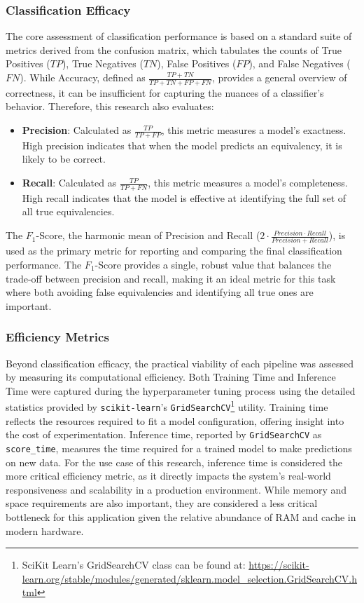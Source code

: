 \subsubsection{Classification Efficacy}\label{ch:3.4.2.1}
The core assessment of classification performance is based on a standard suite of metrics derived from the confusion matrix, which tabulates the counts of True Positives (\(TP\)), True Negatives (\(TN\)), False Positives (\(FP\)), and False Negatives (\(FN\)). While Accuracy, defined as \(\frac{TP + TN}{TP + TN + FP + FN}\), provides a general overview of correctness, it can be insufficient for capturing the nuances of a classifier's behavior. Therefore, this research also evaluates:
\begin{itemize}
    \item \textbf{Precision}: Calculated as \(\frac{TP}{TP + FP}\), this metric measures a model's exactness. High precision indicates that when the model predicts an equivalency, it is likely to be correct.
    \item \textbf{Recall}: Calculated as \(\frac{TP}{TP + FN}\), this metric measures a model's completeness. High recall indicates that the model is effective at identifying the full set of all true equivalencies.
\end{itemize}
The \(F_1\)-Score, the harmonic mean of Precision and Recall (\(2\cdot\frac{Precision\cdot Recall}{Precision + Recall}\)), is used as the primary metric for reporting and comparing the final classification performance. The \(F_1\)-Score provides a single, robust value that balances the trade-off between precision and recall, making it an ideal metric for this task where both avoiding false equivalencies and identifying all true ones are important.

\subsubsection{Efficiency Metrics}\label{ch:3.4.2.2}
Beyond classification efficacy, the practical viability of each pipeline was assessed by measuring its computational efficiency. Both Training Time and Inference Time were captured during the hyperparameter tuning process using the detailed statistics provided by \verb|scikit-learn|'s \verb|GridSearchCV|\footnote{SciKit Learn's GridSearchCV class can be found at: \url{https://scikit-learn.org/stable/modules/generated/sklearn.model_selection.GridSearchCV.html}} utility. Training time reflects the resources required to fit a model configuration, offering insight into the cost of experimentation. Inference time, reported by \verb|GridSearchCV| as \verb|score_time|, measures the time required for a trained model to make predictions on new data. For the use case of this research, inference time is considered the more critical efficiency metric, as it directly impacts the system's real-world responsiveness and scalability in a production environment.  While memory and space requirements are also important, they are considered a less critical bottleneck for this application given the relative abundance of RAM and cache in modern hardware.

